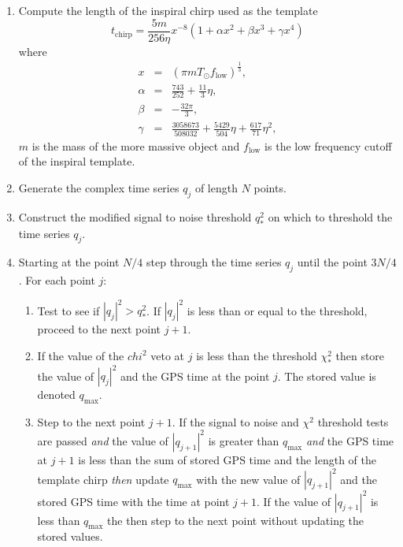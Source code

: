 \begin{enumerate}
\item Compute the length of the inspiral chirp used as the template
\begin{equation}
t_\mathrm{chirp} = \frac{5m}{256\eta} 
  x^{-8}\left(1 + \alpha x^2 + \beta x^3 + \gamma x^4 \right)
\end{equation}
where
\begin{eqnarray}
x & = & \left(\pi m T_\odot f_{\mathrm{low}}\right)^{\frac{1}{3}}, \\
\alpha & = & \frac{743}{252} + \frac{11}{3}\eta, \\
\beta & = & -\frac{32\pi}{3}, \\
\gamma & = & \frac{3058673}{508032}+\frac{5429}{504}\eta+\frac{617}{71}\eta^2,
\end{eqnarray}
$m$ is the mass of the more massive object and $f_{\mathrm{low}}$ is the low
frequency cutoff of the inspiral template.

\item Generate the complex time series $q_j$ of length $N$ points.

\item Construct the modified signal to noise threshold $q^2_\ast$
on which to threshold the time series $q_j$.

\item Starting at the point $N/4$ step through the time series $q_j$ until the
point $3N/4$. For each point $j$: 
\begin{enumerate}
\item Test to see if $|q_j|^2 > q^2_\ast$. If $|q_j|^2$ is less than or equal
to the threshold, proceed to the next point $j+1$.

\item If the value of the $chi^2$ veto at $j$ is less than the threshold
$\chi^2_\ast$ then store the value of $|q_j|^2$ and the GPS time at the point
$j$.  The stored value is denoted $q_{\mathrm{max}}$.

\item Step to the next point $j+1$. If the signal to noise and $\chi^2$
threshold tests are passed \textit{and} the value of $|q_{j+1}|^2$ is
greater than $q_{\mathrm{max}}$ \textit{and} the GPS time at $j+1$ is less
than the sum of stored GPS time and the length of the template chirp
\textit{then} update $q_{\mathrm{max}}$ with the new value of $|q_{j+1}|^2$
and the stored GPS time with the time at point $j+1$.  If the value of
$|q_{j+1}|^2$ is less than $q_{\mathrm{max}}$ the then step to the next point
without updating the stored values. 


\end{enumerate}
\end{enumerate}
